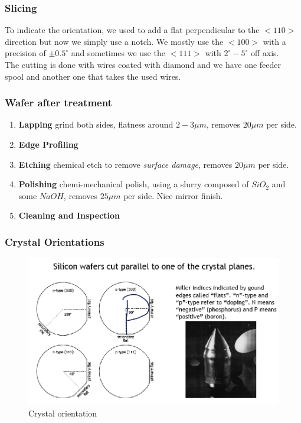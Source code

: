 \documentclass{report}
\begin{document}
\subsubsection{Slicing}

To indicate the orientation, we used to add a flat perpendicular to the $<110>$ direction but now we simply use a notch. We mostly use the $<100>$ with a precision of $\pm 0.5^\circ$ and sometimes we use the $<111>$ with $2^\circ-5^\circ$ off axis.\\ 

The cutting is done with wires coated with diamond and we have one feeder spool and another one that takes the used wires.

\subsubsection{Wafer after treatment}

\begin{enumerate}
    \item \textbf{Lapping} grind both sides, flatness around $2-3 \mu m$, removes $20\mu m$ per side.
    \item \textbf{Edge Profiling}
    \item \textbf{Etching} chemical etch to remove \textit{surface damage}, removes $20\mu m$ per side.
    \item \textbf{Polishing} chemi-mechanical polish, using a slurry composed of $Si O_2$ and some $NaOH$, removes $25\mu m$ per side. Nice mirror finish.
    \item \textbf{Cleaning and Inspection}
\end{enumerate}

\subsubsection{Crystal Orientations}

\begin{figure}[H]
    \centering
    \includegraphics[width=0.75\linewidth]{crystal_orientation.png}
    \caption{Crystal orientation}
    \label{fig:crystal-orientation-label}
\end{figure}
\end{document}

